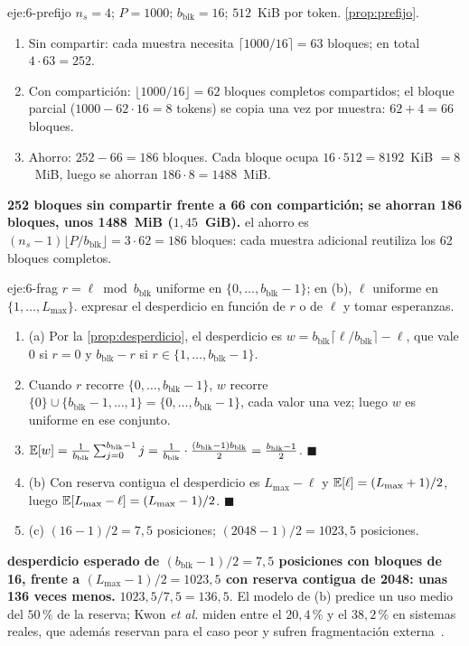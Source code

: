 \begin{solucion}{eje:6-prefijo}
\datos $n_s=4$; $P=1000$; $b_{\mathrm{blk}}=16$; $512$~KiB por token.
\planteamiento \cref{prop:prefijo}.
\pasos
\begin{enumerate}[label=\arabic*.]
  \item Sin compartir: cada muestra necesita $\lceil 1000/16\rceil=63$ bloques; en total $4\cdot 63=252$.
  \item Con compartición: $\lfloor 1000/16\rfloor=62$ bloques completos compartidos; el bloque parcial ($1000-62\cdot 16=8$ tokens) se copia una vez por muestra: $62+4=66$ bloques.
  \item Ahorro: $252-66=186$ bloques. Cada bloque ocupa $16\cdot 512=8192$~KiB $=8$~MiB, luego se ahorran $186\cdot 8=1488$~MiB.
\end{enumerate}
\resultado \textbf{252 bloques sin compartir frente a 66 con compartición; se ahorran 186 bloques, unos 1488~MiB ($1{,}45$~GiB).}
\comprobacion el ahorro es $(n_s-1)\lfloor P/b_{\mathrm{blk}}\rfloor=3\cdot 62=186$ bloques: cada muestra adicional reutiliza los 62 bloques completos.
\end{solucion}

\begin{solucion}{eje:6-frag}
\datos $r=\ell\bmod b_{\mathrm{blk}}$ uniforme en $\{0,\dots,b_{\mathrm{blk}}-1\}$; en (b), $\ell$ uniforme en $\{1,\dots,L_{\max}\}$.
\planteamiento expresar el desperdicio en función de $r$ o de $\ell$ y tomar esperanzas.
\pasos
\begin{enumerate}[label=\arabic*.]
  \item (a) Por la \cref{prop:desperdicio}, el desperdicio es $w=b_{\mathrm{blk}}\lceil\ell/b_{\mathrm{blk}}\rceil-\ell$, que vale $0$ si $r=0$ y $b_{\mathrm{blk}}-r$ si $r\in\{1,\dots,b_{\mathrm{blk}}-1\}$.
  \item Cuando $r$ recorre $\{0,\dots,b_{\mathrm{blk}}-1\}$, $w$ recorre $\{0\}\cup\{b_{\mathrm{blk}}-1,\dots,1\}=\{0,\dots,b_{\mathrm{blk}}-1\}$, cada valor una vez; luego $w$ es uniforme en ese conjunto.
  \item $\mathbb{E}[w]=\frac{1}{b_{\mathrm{blk}}}\sum_{j=0}^{b_{\mathrm{blk}}-1}j=\frac{1}{b_{\mathrm{blk}}}\cdot\frac{(b_{\mathrm{blk}}-1)b_{\mathrm{blk}}}{2}=\frac{b_{\mathrm{blk}}-1}{2}$. \hfill$\blacksquare$
  \item (b) Con reserva contigua el desperdicio es $L_{\max}-\ell$ y $\mathbb{E}[\ell]=(L_{\max}+1)/2$, luego $\mathbb{E}[L_{\max}-\ell]=(L_{\max}-1)/2$. \hfill$\blacksquare$
  \item (c) $(16-1)/2=7{,}5$ posiciones; $(2048-1)/2=1023{,}5$ posiciones.
\end{enumerate}
\resultado \textbf{desperdicio esperado de $(b_{\mathrm{blk}}-1)/2=7{,}5$ posiciones con bloques de 16, frente a $(L_{\max}-1)/2=1023{,}5$ con reserva contigua de 2048: unas 136 veces menos.}
\comprobacion $1023{,}5/7{,}5=136{,}5$. El modelo de (b) predice un uso medio del $50\,\%$ de la reserva; Kwon \emph{et al.} miden entre el $20{,}4\,\%$ y el $38{,}2\,\%$ en sistemas reales, que además reservan para el caso peor y sufren fragmentación externa~\cite{kwon}.
\end{solucion}
